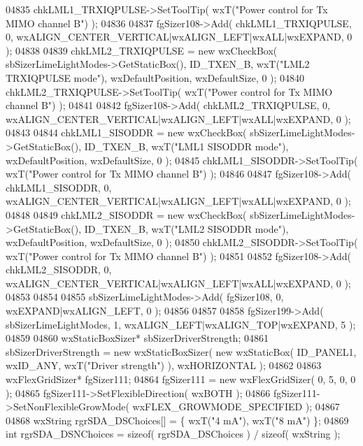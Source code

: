 \begin{DoxyCode}
04835     chkLML1_TRXIQPULSE->SetToolTip( wxT(\textcolor{stringliteral}{"Power control for Tx MIMO channel B"}) );
04836     
04837     fgSizer108->Add( chkLML1_TRXIQPULSE, 0, wxALIGN\_CENTER\_VERTICAL|wxALIGN\_LEFT|wxALL|wxEXPAND, 0 );
04838     
04839     chkLML2_TRXIQPULSE = \textcolor{keyword}{new} wxCheckBox( sbSizerLimeLightModes->GetStaticBox(), 
      ID_TXEN_B, wxT(\textcolor{stringliteral}{"LML2 TRXIQPULSE mode"}), wxDefaultPosition, wxDefaultSize, 0 );
04840     chkLML2_TRXIQPULSE->SetToolTip( wxT(\textcolor{stringliteral}{"Power control for Tx MIMO channel B"}) );
04841     
04842     fgSizer108->Add( chkLML2_TRXIQPULSE, 0, wxALIGN\_CENTER\_VERTICAL|wxALIGN\_LEFT|wxALL|wxEXPAND, 0 );
04843     
04844     chkLML1_SISODDR = \textcolor{keyword}{new} wxCheckBox( sbSizerLimeLightModes->GetStaticBox(), 
      ID_TXEN_B, wxT(\textcolor{stringliteral}{"LML1 SISODDR mode"}), wxDefaultPosition, wxDefaultSize, 0 );
04845     chkLML1_SISODDR->SetToolTip( wxT(\textcolor{stringliteral}{"Power control for Tx MIMO channel B"}) );
04846     
04847     fgSizer108->Add( chkLML1_SISODDR, 0, wxALIGN\_CENTER\_VERTICAL|wxALIGN\_LEFT|wxALL|wxEXPAND, 0 );
04848     
04849     chkLML2_SISODDR = \textcolor{keyword}{new} wxCheckBox( sbSizerLimeLightModes->GetStaticBox(), 
      ID_TXEN_B, wxT(\textcolor{stringliteral}{"LML2 SISODDR mode"}), wxDefaultPosition, wxDefaultSize, 0 );
04850     chkLML2_SISODDR->SetToolTip( wxT(\textcolor{stringliteral}{"Power control for Tx MIMO channel B"}) );
04851     
04852     fgSizer108->Add( chkLML2_SISODDR, 0, wxALIGN\_CENTER\_VERTICAL|wxALIGN\_LEFT|wxALL|wxEXPAND, 0 );
04853     
04854     
04855     sbSizerLimeLightModes->Add( fgSizer108, 0, wxEXPAND|wxALIGN\_LEFT, 0 );
04856     
04857     
04858     fgSizer199->Add( sbSizerLimeLightModes, 1, wxALIGN\_LEFT|wxALIGN\_TOP|wxEXPAND, 5 );
04859     
04860     wxStaticBoxSizer* sbSizerDriverStrength;
04861     sbSizerDriverStrength = \textcolor{keyword}{new} wxStaticBoxSizer( \textcolor{keyword}{new} wxStaticBox( ID_PANEL1, wxID\_ANY, wxT(\textcolor{stringliteral}{"Driver
       strength"}) ), wxHORIZONTAL );
04862     
04863     wxFlexGridSizer* fgSizer111;
04864     fgSizer111 = \textcolor{keyword}{new} wxFlexGridSizer( 0, 5, 0, 0 );
04865     fgSizer111->SetFlexibleDirection( wxBOTH );
04866     fgSizer111->SetNonFlexibleGrowMode( wxFLEX\_GROWMODE\_SPECIFIED );
04867     
04868     wxString rgrSDA\_DSChoices[] = \{ wxT(\textcolor{stringliteral}{"4 mA"}), wxT(\textcolor{stringliteral}{"8 mA"}) \};
04869     \textcolor{keywordtype}{int} rgrSDA\_DSNChoices = \textcolor{keyword}{sizeof}( rgrSDA\_DSChoices ) / \textcolor{keyword}{sizeof}( wxString );

\end{DoxyCode}
